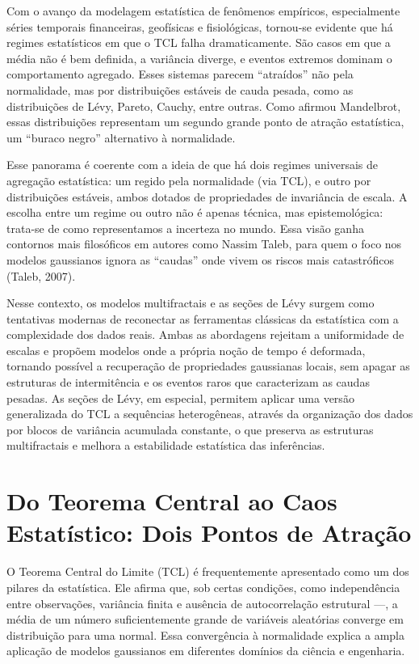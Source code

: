 \documentclass[
]{agujournal2019}
\begin{document}
Com o avanço da modelagem estatística de fenômenos empíricos,
especialmente séries temporais financeiras, geofísicas e fisiológicas,
tornou-se evidente que há regimes estatísticos em que o TCL falha
dramaticamente. São casos em que a média não é bem definida, a variância
diverge, e eventos extremos dominam o comportamento agregado. Esses
sistemas parecem ``atraídos'' não pela normalidade, mas por
distribuições estáveis de cauda pesada, como as distribuições de Lévy,
Pareto, Cauchy, entre outras. Como afirmou Mandelbrot, essas
distribuições representam um segundo grande ponto de atração
estatística, um ``buraco negro'' alternativo à normalidade.

Esse panorama é coerente com a ideia de que há dois regimes universais
de agregação estatística: um regido pela normalidade (via TCL), e outro
por distribuições estáveis, ambos dotados de propriedades de invariância
de escala. A escolha entre um regime ou outro não é apenas técnica, mas
epistemológica: trata-se de como representamos a incerteza no mundo.
Essa visão ganha contornos mais filosóficos em autores como Nassim
Taleb, para quem o foco nos modelos gaussianos ignora as ``caudas'' onde
vivem os riscos mais catastróficos (Taleb, 2007).

Nesse contexto, os modelos multifractais e as seções de Lévy surgem como
tentativas modernas de reconectar as ferramentas clássicas da
estatística com a complexidade dos dados reais. Ambas as abordagens
rejeitam a uniformidade de escalas e propõem modelos onde a própria
noção de tempo é deformada, tornando possível a recuperação de
propriedades gaussianas locais, sem apagar as estruturas de
intermitência e os eventos raros que caracterizam as caudas pesadas. As
seções de Lévy, em especial, permitem aplicar uma versão generalizada do
TCL a sequências heterogêneas, através da organização dos dados por
blocos de variância acumulada constante, o que preserva as estruturas
multifractais e melhora a estabilidade estatística das inferências.

\section{Do Teorema Central ao Caos Estatístico: Dois Pontos de
Atração}\label{do-teorema-central-ao-caos-estatuxedstico-dois-pontos-de-atrauxe7uxe3o}

O Teorema Central do Limite (TCL) é frequentemente apresentado como um
dos pilares da estatística. Ele afirma que, sob certas condições, como
independência entre observações, variância finita e ausência de
autocorrelação estrutural ---, a média de um número suficientemente
grande de variáveis aleatórias converge em distribuição para uma normal.
Essa convergência à normalidade explica a ampla aplicação de modelos
gaussianos em diferentes domínios da ciência e engenharia.
\end{document}
